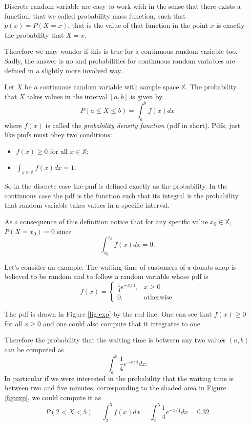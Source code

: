 \documentclass[
]{book}
\theoremstyle{definition}
\theoremstyle{definition}
\theoremstyle{definition}
\theoremstyle{definition}
\theoremstyle{remark}
\begin{document}
Discrete random variable are easy to work with in the sense that there exists a function, that we called probability mass function, such that \(p(x)=P(X=x)\), that is the value of that function in the point \(x\) is exactly the probability that \(X=x\).

Therefore we may wonder if this is true for a continuous random variable too. Sadly, the answer is no and probabilities for continuous random variables are defined in a slightly more involved way.

Let \(X\) be a continuous random variable with sample space \(\mathbb{X}\). The probability that \(X\) takes values in the interval \([a,b]\) is given by
\[
P(a\leq X \leq b) = \int_{a}^bf(x)dx
\]
where \(f(x)\) is called the \emph{probability density function} (pdf in short). Pdfs, just like pmfs must obey two conditions:

\begin{itemize}
\item
  \(f(x)\geq 0\) for all \(x\in\mathbb{X}\);
\item
  \(\int_{x\in\mathbb{X}}f(x)dx=1\).
\end{itemize}

So in the discrete case the pmf is defined exactly as the probability. In the continuous case the pdf is the function such that its integral is the probability that random variable takes values in a specific interval.

As a consequence of this definition notice that for any specific value \(x_0\in\mathbb{X}\), \(P(X=x_0)=0\) since
\[
\int_{x_0}^{x_0}f(x)dx = 0.
\]

Let's consider an example. The waiting time of customers of a donuts shop is believed to be random and to follow a random variable whose pdf is
\[
f(x) = \left\{
\begin{array}{ll}
\frac{1}{4}e^{-x/4}, & x\geq 0\\
0, & \mbox{otherwise}
\end{array}
\right.
\]

The pdf is drawn in Figure \ref{fig:exp} by the red line. One can see that \(f(x)\geq 0\) for all \(x\geq 0\) and one could also compute that it integrates to one.

Therefore the probability that the waiting time is between any two values \((a,b)\) can be computed as
\[
\int_a^b\frac{1}{4}e^{-x/4}dx.
\]
In particular if we were interested in the probability that the waiting time is between two and five minutes, corresponding to the shaded area in Figure \ref{fig:exp}, we could compute it as
\[
P(2<X<5)=\int_2^5f(x)dx=\int_{2}^5\frac{1}{4}e^{-x/4}dx= 0.32
\]
\end{document}
